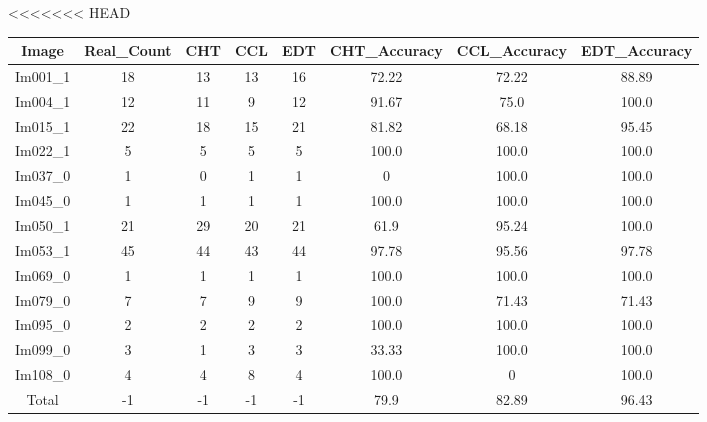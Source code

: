 \begin{table}[H]
<<<<<<< HEAD
    \centering
    \begin{tabular}{|c|c|c|c|c|c|c|c|}
    \hline
     \textbf{Image} & \textbf{Real\_Count} & \textbf{CHT} & \textbf{CCL} & \textbf{EDT} & \textbf{CHT\_Accuracy} & \textbf{CCL\_Accuracy} & \textbf{EDT\_Accuracy} \\ \hline
     Im001\_1 & 18 & 13 & 13 & 16 & 72.22 & 72.22 & 88.89 \\ 
     Im004\_1 & 12 & 11 & 9 & 12 & 91.67 & 75.0 & 100.0 \\ 
     Im015\_1 & 22 & 18 & 15 & 21 & 81.82 & 68.18 & 95.45 \\ 
     Im022\_1 & 5 & 5 & 5 & 5 & 100.0 & 100.0 & 100.0 \\ 
     Im037\_0 & 1 & 0 & 1 & 1 & 0 & 100.0 & 100.0 \\ 
     Im045\_0 & 1 & 1 & 1 & 1 & 100.0 & 100.0 & 100.0 \\ 
     Im050\_1 & 21 & 29 & 20 & 21 & 61.9 & 95.24 & 100.0 \\ 
     Im053\_1 & 45 & 44 & 43 & 44 & 97.78 & 95.56 & 97.78 \\ 
     Im069\_0 & 1 & 1 & 1 & 1 & 100.0 & 100.0 & 100.0 \\ 
     Im079\_0 & 7 & 7 & 9 & 9 & 100.0 & 71.43 & 71.43 \\ 
     Im095\_0 & 2 & 2 & 2 & 2 & 100.0 & 100.0 & 100.0 \\ 
     Im099\_0 & 3 & 1 & 3 & 3 & 33.33 & 100.0 & 100.0 \\ 
     Im108\_0 & 4 & 4 & 8 & 4 & 100.0 & 0 & 100.0 \\ \hline
     Total & -1 & -1 & -1 & -1 & 79.9 & 82.89 & 96.43 \\ 
    

\end{tabular}
\end{table}
